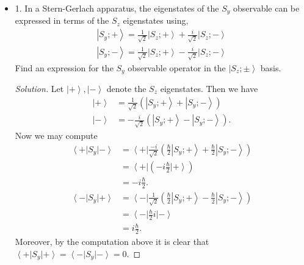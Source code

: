 
\begin{itemize}
	\item 
1. In a Stern-Gerlach apparatus, the eigenstates of the $S_y$ observable can be expressed in terms of the $S_z$ eigenstates using,
\[
\begin{gathered}
\left|S_y ;+\right\rangle=\frac{1}{\sqrt{2}}\left|S_z ;+\right\rangle+\frac{i}{\sqrt{2}}\left|S_z ;-\right\rangle \\
\left|S_y ;-\right\rangle=\frac{1}{\sqrt{2}}\left|S_z ;+\right\rangle-\frac{i}{\sqrt{2}}\left|S_z ;-\right\rangle
\end{gathered}
\]
Find an expression for the $S_y$ observable operator in the $\left|S_z ; \pm\right\rangle$ basis.
\begin{proof}[Solution]
	Let $\left| + \right\rangle , \left| - \right\rangle $ denote the $S_z$ eigenstates. Then we have
	\begin{align*}
		\left| + \right\rangle &=  \frac{1}{\sqrt{2}}\left( \left| S_y; + \right\rangle + \left| S_y; - \right\rangle  \right) \\
		\left| - \right\rangle &= -\frac{i}{\sqrt{2} } \left( \left| S_y; + \right\rangle - \left| S_y; - \right\rangle  \right)  
	.\end{align*}
	Now we may compute
	\begin{align*}
		\left\langle + \right| S_y \left| - \right\rangle 
		&= \left\langle + \right| \frac{-i}{\sqrt{2} }\left( \frac{\hbar}{2} \left| S_y; + \right\rangle + \frac{\hbar}{2} \left| S_y;- \right\rangle  \right)   \\
		&= \left\langle + \right| \left( -i\frac{\hbar}{2} \left| + \right\rangle  \right)  \\
		&= -i\frac{\hbar}{2} 
	.\end{align*}
	\begin{align*}
		\left\langle - \right| S_y \left| + \right\rangle 
		&= \left\langle - \right| \frac{1}{\sqrt{2} }\left( \frac{\hbar}{2} \left| S_y; + \right\rangle - \frac{\hbar}{2} \left| S_y; - \right\rangle  \right)  \\
		&= \left\langle - \right| \frac{\hbar}{2} i \left| - \right\rangle  \\
		&= i \frac{\hbar}{2}
	.\end{align*}
	Moreover, by the computation above it is clear that $\left\langle + \right| S_y \left| + \right\rangle  = \left\langle - \right| S_y \left| - \right\rangle  = 0$.


\end{proof}
\end{itemize}
